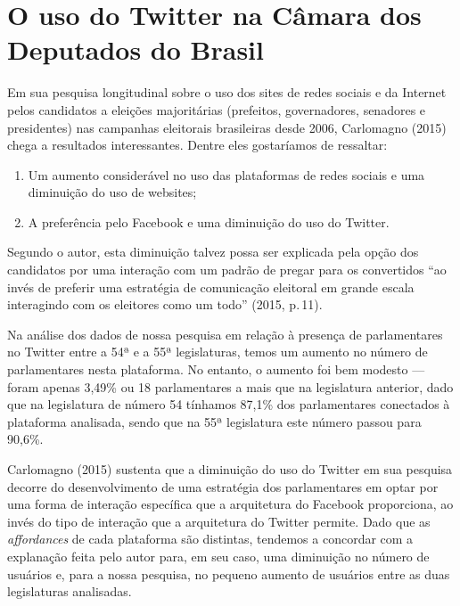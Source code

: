 \section{O uso do Twitter na Câmara dos Deputados do Brasil}

Em sua pesquisa longitudinal sobre o uso dos sites de redes sociais e da
Internet pelos candidatos a eleições majoritárias (prefeitos,
governadores, senadores e presidentes) nas campanhas eleitorais
brasileiras desde 2006, Carlomagno (2015) chega a resultados
interessantes. Dentre eles gostaríamos de ressaltar: 

\begin{enumerate}

\item Um aumento
considerável no uso das plataformas de redes sociais e uma diminuição do
uso de websites; 

\item A preferência pelo Facebook e uma diminuição do
uso do Twitter. 
\end{enumerate}

Segundo o autor, esta diminuição talvez possa ser
explicada pela opção dos candidatos por uma interação com um padrão de
pregar para os convertidos ``ao invés de preferir uma estratégia de
comunicação eleitoral em grande escala interagindo com os eleitores como
um todo'' (2015, p.\,11).

Na análise dos dados de nossa pesquisa em relação à presença de
parlamentares no Twitter entre a 54ª e a 55ª legislaturas, temos um
aumento no número de parlamentares nesta plataforma. No entanto, o
aumento foi bem modesto --- foram apenas 3,49\% ou 18 parlamentares a mais
que na legislatura anterior, dado que na legislatura de número 54
tínhamos 87,1\% dos parlamentares conectados à plataforma analisada,
sendo que na 55ª legislatura este número passou para 90,6\%.

Carlomagno (2015) sustenta que a diminuição do uso do Twitter em sua
pesquisa decorre do desenvolvimento de uma estratégia dos parlamentares
em optar por uma forma de interação específica que a arquitetura do
Facebook proporciona, ao invés do tipo de interação que a arquitetura do
Twitter permite. Dado que as \emph{affordances} de cada plataforma são
distintas, tendemos a concordar com a explanação feita pelo autor para,
em seu caso, uma diminuição no número de usuários e, para a nossa
pesquisa, no pequeno aumento de usuários entre as duas legislaturas
analisadas. 


